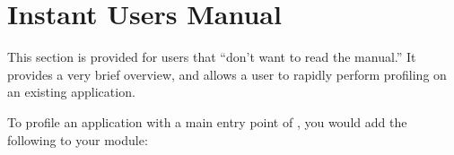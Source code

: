 %
%
%
%
%
%
%
%
%
%


\section{Instant Users Manual \label{profile-instant}}

This section is provided for users that ``don't want to read the
manual.'' It provides a very brief overview, and allows a user to
rapidly perform profiling on an existing application.

To profile an application with a main entry point of ,
you would add the following to your module:

